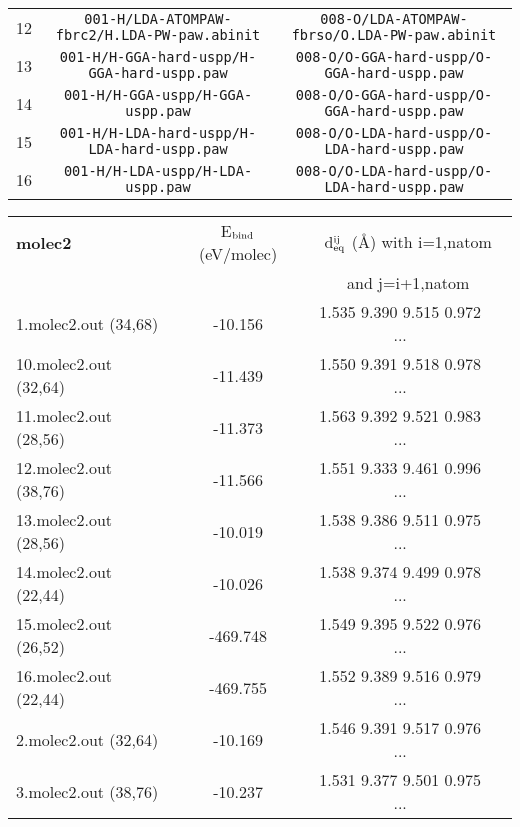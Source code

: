 \documentclass[onecolumn]{revtex4}
\begin{document}
\begin{center}
\begin{tabular}{lcc}
12 & \verb?001-H/LDA-ATOMPAW-fbrc2/H.LDA-PW-paw.abinit? & \verb?008-O/LDA-ATOMPAW-fbrso/O.LDA-PW-paw.abinit? \\
13 & \verb?001-H/H-GGA-hard-uspp/H-GGA-hard-uspp.paw? & \verb?008-O/O-GGA-hard-uspp/O-GGA-hard-uspp.paw? \\
14 & \verb?001-H/H-GGA-uspp/H-GGA-uspp.paw? & \verb?008-O/O-GGA-hard-uspp/O-GGA-hard-uspp.paw? \\
15 & \verb?001-H/H-LDA-hard-uspp/H-LDA-hard-uspp.paw? & \verb?008-O/O-LDA-hard-uspp/O-LDA-hard-uspp.paw? \\
16 & \verb?001-H/H-LDA-uspp/H-LDA-uspp.paw? & \verb?008-O/O-LDA-hard-uspp/O-LDA-hard-uspp.paw? \\
\hline
\end{tabular}
\end{center}
\begin{center}
\begin{tabular}{lccccc}
\hline
\hline
\bf{molec2}&\multicolumn{2}{c}{E$_{\rm bind}$ (eV/molec)}&\multicolumn{3}{c}{d$_{\rm eq}^{\rm ij}$ (\AA) with i=1,natom} \\
&\multicolumn{2}{c}{}&\multicolumn{3}{c}{and j=i+1,natom} \\
\hline
1.molec2.out (34,68)&\multicolumn{2}{c}{-10.156}&\multicolumn{2}{c}{1.535 9.390 9.515 0.972 ...} \\ 
10.molec2.out (32,64)&\multicolumn{2}{c}{-11.439}&\multicolumn{2}{c}{1.550 9.391 9.518 0.978 ...} \\ 
11.molec2.out (28,56)&\multicolumn{2}{c}{-11.373}&\multicolumn{2}{c}{1.563 9.392 9.521 0.983 ...} \\ 
12.molec2.out (38,76)&\multicolumn{2}{c}{-11.566}&\multicolumn{2}{c}{1.551 9.333 9.461 0.996 ...} \\ 
13.molec2.out (28,56)&\multicolumn{2}{c}{-10.019}&\multicolumn{2}{c}{1.538 9.386 9.511 0.975 ...} \\ 
14.molec2.out (22,44)&\multicolumn{2}{c}{-10.026}&\multicolumn{2}{c}{1.538 9.374 9.499 0.978 ...} \\ 
15.molec2.out (26,52)&\multicolumn{2}{c}{-469.748}&\multicolumn{2}{c}{1.549 9.395 9.522 0.976 ...} \\ 
16.molec2.out (22,44)&\multicolumn{2}{c}{-469.755}&\multicolumn{2}{c}{1.552 9.389 9.516 0.979 ...} \\ 
2.molec2.out (32,64)&\multicolumn{2}{c}{-10.169}&\multicolumn{2}{c}{1.546 9.391 9.517 0.976 ...} \\ 
3.molec2.out (38,76)&\multicolumn{2}{c}{-10.237}&\multicolumn{2}{c}{1.531 9.377 9.501 0.975 ...} \\ 

\end{tabular}
\end{center}
\end{document}
